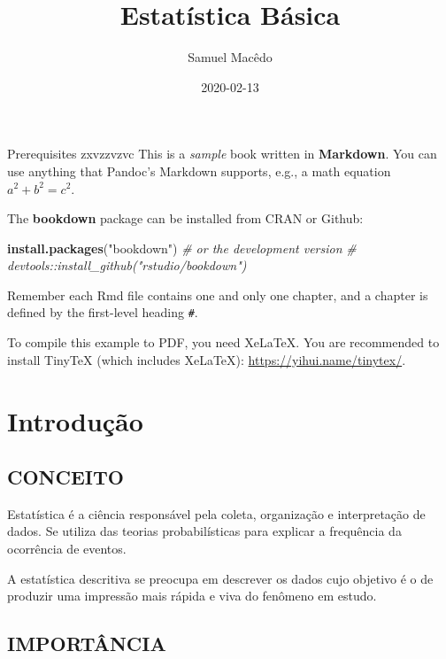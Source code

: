 \documentclass[]{book}
\title{Estatística Básica}
\author{Samuel Macêdo}
\date{2020-02-13}
\newenvironment{Shaded}{\begin{snugshade}}{\end{snugshade}}
\newcommand{\CommentTok}[1]{\textcolor[rgb]{0.56,0.35,0.01}{\textit{#1}}}
\newcommand{\KeywordTok}[1]{\textcolor[rgb]{0.13,0.29,0.53}{\textbf{#1}}}
\newcommand{\NormalTok}[1]{#1}
\newcommand{\StringTok}[1]{\textcolor[rgb]{0.31,0.60,0.02}{#1}}
\begin{document}
\maketitle

{
\setcounter{tocdepth}{1}
\tableofcontents
}
Prerequisites
zxvzzvzvc
This is a \emph{sample} book written in \textbf{Markdown}. You can use anything that Pandoc's Markdown supports, e.g., a math equation \(a^2 + b^2 = c^2\).

The \textbf{bookdown} package can be installed from CRAN or Github:

\begin{Shaded}
\begin{Highlighting}[]
\KeywordTok{install.packages}\NormalTok{(}\StringTok{"bookdown"}\NormalTok{)}
\CommentTok{# or the development version}
\CommentTok{# devtools::install_github("rstudio/bookdown")}
\end{Highlighting}
\end{Shaded}

Remember each Rmd file contains one and only one chapter, and a chapter is defined by the first-level heading \texttt{\#}.

To compile this example to PDF, you need XeLaTeX. You are recommended to install TinyTeX (which includes XeLaTeX): \url{https://yihui.name/tinytex/}.

\hypertarget{introducao}{%
\chapter{Introdução}\label{introducao}}

\hypertarget{conceito}{%
\section{CONCEITO}\label{conceito}}

Estatística é a ciência responsável pela coleta, organização e interpretação de dados. Se utiliza das teorias probabilísticas para explicar a frequência da ocorrência de eventos.

A estatística descritiva se preocupa em descrever os dados cujo objetivo é o de produzir uma impressão mais rápida e viva do fenômeno em estudo.

\hypertarget{importancia}{%
\section{IMPORTÂNCIA}\label{importancia}}
\end{document}
